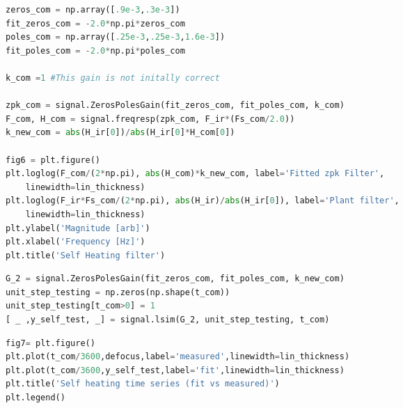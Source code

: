 \begin{spacing}{1.2} \begin{lstlisting}[frame=single,language=Python]
zeros_com = np.array([.9e-3,.3e-3])
fit_zeros_com = -2.0*np.pi*zeros_com
poles_com = np.array([.25e-3,.25e-3,1.6e-3])
fit_poles_com = -2.0*np.pi*poles_com

k_com =1 #This gain is not initally correct

zpk_com = signal.ZerosPolesGain(fit_zeros_com, fit_poles_com, k_com)
F_com, H_com = signal.freqresp(zpk_com, F_ir*(Fs_com/2.0))
k_new_com = abs(H_ir[0])/abs(H_ir[0]*H_com[0])

fig6 = plt.figure()
plt.loglog(F_com/(2*np.pi), abs(H_com)*k_new_com, label='Fitted zpk Filter', 
    linewidth=lin_thickness)
plt.loglog(F_ir*Fs_com/(2*np.pi), abs(H_ir)/abs(H_ir[0]), label='Plant filter', 
    linewidth=lin_thickness)
plt.ylabel('Magnitude [arb]')
plt.xlabel('Frequency [Hz]')
plt.title('Self Heating filter')
\end{lstlisting} \end{spacing}


\begin{spacing}{1.2} \begin{lstlisting}[frame=single,language=Python]
G_2 = signal.ZerosPolesGain(fit_zeros_com, fit_poles_com, k_new_com)
unit_step_testing = np.zeros(np.shape(t_com))
unit_step_testing[t_com>0] = 1
[ _ ,y_self_test, _] = signal.lsim(G_2, unit_step_testing, t_com)
\end{lstlisting} \end{spacing}

\begin{spacing}{1.2} \begin{lstlisting}[frame=single,language=Python]
fig7= plt.figure()
plt.plot(t_com/3600,defocus,label='measured',linewidth=lin_thickness)
plt.plot(t_com/3600,y_self_test,label='fit',linewidth=lin_thickness)
plt.title('Self heating time series (fit vs measured)')
plt.legend()
\end{lstlisting} \end{spacing}


